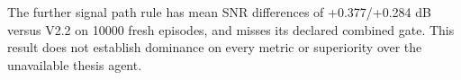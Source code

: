 The further signal path rule has mean SNR differences of +0.377/+0.284 dB versus V2.2 on 10000 fresh episodes, and misses its declared combined gate. This result does not establish dominance on every metric or superiority over the unavailable thesis agent.
